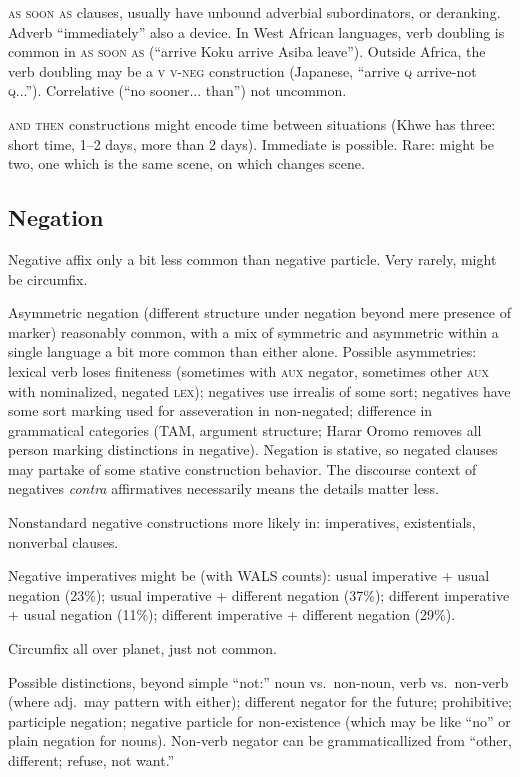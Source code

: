 \documentclass[11pt]{article}
\newcommand{\E}[1]{\textit{#1}}   %
\newcommand{\I}[1]{\textsc{#1}}   %
\begin{document}
{\I{as soon as} clauses, usually have unbound adverbial subordinators,
or deranking.  Adverb ``immediately'' also a device.  In West African
languages, verb doubling is common in \I{as soon as} (``arrive Koku
arrive Asiba leave'').  Outside Africa, the verb doubling may be a
\I{v v-neg} construction (Japanese, ``arrive \I{q} arrive-not
\I{q}...'').  Correlative (``no sooner... than'') not uncommon.

\I{and then} constructions might encode time between situations (Khwe
has three: short time, 1--2 days, more than 2 days). Immediate is
possible.  Rare: might be two, one which is the same scene, on which
changes scene.


\subsection{Negation}
Negative affix only a bit less common than negative particle.  Very
rarely, might be circumfix.

Asymmetric negation (different structure under negation beyond mere
presence of marker) reasonably common, with a mix of symmetric and
asymmetric within a single language a bit more common than either
alone.  Possible asymmetries: lexical verb loses finiteness (sometimes
with \I{aux} negator, sometimes other \I{aux} with nominalized,
negated \I{lex}); negatives use irrealis of some sort; negatives have
some sort marking used for asseveration in non-negated; difference in
grammatical categories (TAM, argument structure; Harar Oromo removes
all person marking distinctions in negative).  Negation is stative, so
negated clauses may partake of some stative construction behavior.
The discourse context of negatives \E{contra} affirmatives necessarily
means the details matter less.

Nonstandard negative constructions more likely in: imperatives,
existentials, nonverbal clauses.

Negative imperatives might be (with WALS counts): usual imperative +
usual negation (23\%); usual imperative + different negation (37\%);
different imperative + usual negation (11\%); different imperative +
different negation (29\%).

Circumfix all over planet, just not common.

Possible distinctions, beyond simple ``not:'' noun vs.\ non-noun, verb
vs.\ non-verb (where adj.\ may pattern with either); different negator
for the future; prohibitive; participle negation; negative particle
for non-existence (which may be like ``no'' or plain negation for
nouns).  Non-verb negator can be grammaticallized from ``other,
different; refuse, not want.''

}
\end{document}
